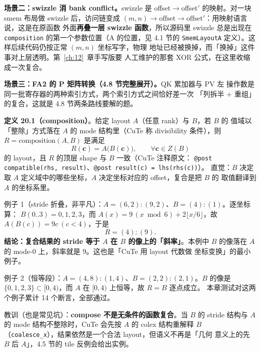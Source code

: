 \textbf{场景二：swizzle 消 bank conflict。}\allowbreak{}swizzle 是
offset$\to$offset$'$ 的映射。对一块 smem 布局做 swizzle 后，访问链变成
$(m,n)\to\mathrm{offset}\to\mathrm{offset}'$：用映射语言说，这是在原函数
外面\textbf{再叠一层 swizzle 函数}，所以源码里 swizzle 总是出现在
\texttt{composition} 的第一个参数位置（A 的位置，见 4.1 节的
\texttt{SmemLayoutA} 定义）。这样后续代码仍按正常 $(m,n)$ 坐标写字，物理
地址已经被换掉，而「换掉」这件事对上层透明。第~\ref{ch:12}~章手写版要
人工维护的那套 XOR 公式，在这里收缩成一次复合。

\textbf{场景三：FA2 的 P 矩阵转换（4.8 节完整展开）。}\allowbreak{}QK 累加器与 PV 左
操作数是同一批寄存器的两种索引方式，两个索引方式之间恰好差一次
「列拆半 $+$ 重组」的复合，这就是 4.8 节两条路线要解的题。

\textbf{定义 20.1（composition）}。给定 layout $A$（任意 rank）与 $B$，若 $B$ 的
值域以「整除」方式落在 $A$ 的 mode 结构里（CuTe 称 divisibility 条件），则
$R=\mathrm{composition}(A,B)$ 是满足
\begin{equation}
  R(\mathbf{c}) = A\bigl(B(\mathbf{c})\bigr), \qquad \forall \mathbf{c}\in Z(B)
  \label{eq:20-compose}
\end{equation}
的 layout，且 $R$ 的顶层 shape 与 $B$ 一致（CuTe 注释原文：
\texttt{@post compatible\allowbreak{}(rhs,\allowbreak{} result)}、\texttt{@post result(c) = lhs(rhs(c))}）。
直觉：$B$ 决定取 $A$ 定义域中的哪些坐标，$A$ 决定坐标对应的 offset，复合是把 $B$ 的
取值翻译到 $A$ 的坐标系里。

例子 1（stride 折叠，非平凡）：$A=(6,2){:}(9,2)$、$B=(4){:}(1)$。逐坐标算：
$B(0..3)=0,1,2,3$，而 $A(x)=9\,(x\bmod6)+2\lfloor x/6\rfloor$，故
$A(B(c))=9c\ (c<4)$，于是
\begin{equation}
  R = (4){:}(9) .
\end{equation}
\textbf{结论：复合结果的 stride 等于 $A$ 在 $B$ 的像上的「斜率」}。本例中
$B$ 的像落在 $A$ 的 mode-0 上，斜率就是 9。这也是「CuTe 用 layout 代数做
坐标变换」的最小例子。

例子 2（恒等段）：$A=(4,8){:}(1,4)$、$B=(2,2){:}(2,1)$。$B$ 的像是
$\{0,1,2,3\}\subset[0,4)$，而 $A$ 在 $[0,4)$ 上恒等，故 $R=B$ 逐点成立。
本章测试对这两个例子累计 14 个断言，全部通过。

教训（也是常见坑）：\textbf{compose 不是无条件的函数复合}。当 $B$ 的 stride
结构与 $A$ 的 mode 结构不整除时，CuTe 会先按 $A$ 的 colex 结构重解释 $B$
（\texttt{coalesce\_x}），结果依然是一个合法 layout，但语义不再是「几何
意义上的先 $B$ 后 $A$」，4.5 节的 tile 反例会给出实例。

